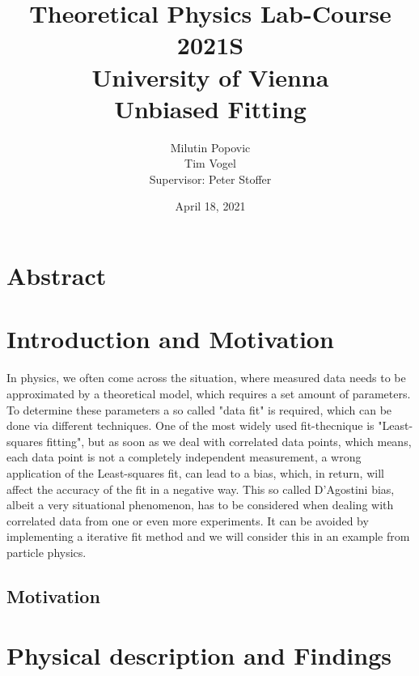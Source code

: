 \documentclass[a4paper]{article}
\title{Theoretical Physics Lab-Course 2021S\\ University of Vienna \vspace{1.5cm}\\ Unbiased Fitting}
\author{Milutin Popovic \\ Tim Vogel \vspace{1.5cm}\\ Supervisor: Peter Stoffer}
\date{April 18, 2021}
\begin{document}
\maketitle

\newpage

\thispagestyle{empty}
\tableofcontents

\newpage

\section{Abstract}
\section{Introduction and Motivation}
In physics, we often come across the situation, where measured data needs to be approximated by a theoretical model,
which requires a set amount of parameters. To determine these parameters a so called "data fit" is required, which can
be done via different techniques. One of the most widely used fit-thecnique is "Least-squares fitting", but as soon
as we deal with correlated  data points, which means, each data point is not a completely independent measurement, a
wrong application of the Least-squares fit, can lead to a bias, which, in return, will affect the accuracy of the
fit in a negative way. This so called D'Agostini bias, albeit a very situational phenomenon, has to be considered when
dealing with correlated data from one or even more experiments. It can be avoided by implementing a iterative fit method and
we will consider this in an example from particle physics.
\subsection{Motivation}

\section{Physical description and Findings} %
\end{document}

